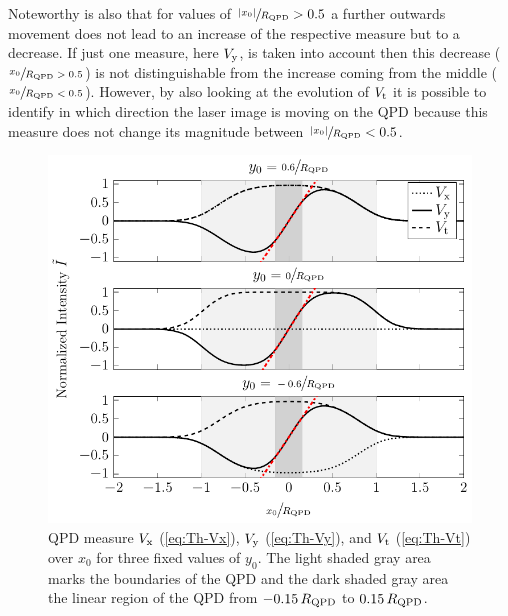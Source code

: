 Noteworthy is also that for values of $\sfrac{\abs{x_{0}}}{R_{\mathrm{QPD}}} > 0.5$ 
a further outwards movement does not lead to an increase of the respective 
measure but to a decrease. If just one measure, here $V_{\mathrm{y}}$, is taken 
into account then this decrease ($\sfrac{x_{0}}{R_{\mathrm{QPD}} > 0.5}$) is not 
distinguishable from the increase coming from the middle 
($\sfrac{x_{0}}{R_{\mathrm{QPD}} < 0.5}$). However, by also looking at the 
evolution of $V_{\mathrm{t}}$ it is possible to identify in which direction the 
laser image is moving on the QPD because this measure does not change its 
magnitude between $\sfrac{\abs{x_{0}}}{R_{\mathrm{QPD}}} < 0.5$.

\begin{figure}[tbp]
  \centering
  \includegraphics[]{Plots/cache/voltages_over_x.pdf}
  \caption{QPD measure $V_{\mathrm{x}}$ (\cref{eq:Th-Vx}), $V_{\mathrm{y}}$
    (\cref{eq:Th-Vy}), and $V_{\mathrm{t}}$ (\cref{eq:Th-Vt}) over $x_{0}$ for 
  three fixed values of $y_{0}$. The light shaded gray area marks the 
boundaries of the QPD and the dark shaded gray area the linear region of the 
QPD from $-0.15\,R_{\mathrm{QPD}}$ to $0.15\,R_{\mathrm{QPD}}$.}
  \label{fig:Th-voltages_over_x}
\end{figure}
